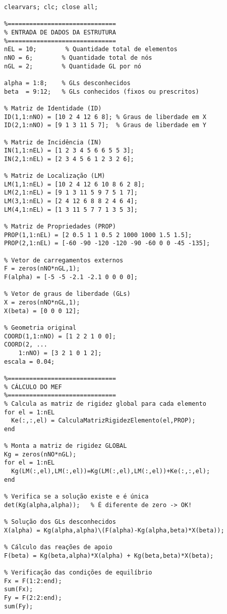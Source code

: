 \documentclass[deposito, acronym, symbols]{fei}
\begin{document}
\begin{lstlisting}
clearvars; clc; close all;

%==============================
% ENTRADA DE DADOS DA ESTRUTURA
%==============================
nEL = 10;        % Quantidade total de elementos
nNO = 6;        % Quantidade total de nós
nGL = 2;        % Quantidade GL por nó

alpha = 1:8;    % GLs desconhecidos
beta  = 9:12;   % GLs conhecidos (fixos ou prescritos)

% Matriz de Identidade (ID)
ID(1,1:nNO) = [10 2 4 12 6 8]; % Graus de liberdade em X
ID(2,1:nNO) = [9 1 3 11 5 7];  % Graus de liberdade em Y

% Matriz de Incidência (IN)
IN(1,1:nEL) = [1 2 3 4 5 6 6 5 5 3];
IN(2,1:nEL) = [2 3 4 5 6 1 2 3 2 6];

% Matriz de Localização (LM)
LM(1,1:nEL) = [10 2 4 12 6 10 8 6 2 8];
LM(2,1:nEL) = [9 1 3 11 5 9 7 5 1 7];
LM(3,1:nEL) = [2 4 12 6 8 8 2 4 6 4];
LM(4,1:nEL) = [1 3 11 5 7 7 1 3 5 3];

% Matriz de Propriedades (PROP)
PROP(1,1:nEL) = [2 0.5 1 1 0.5 2 1000 1000 1.5 1.5];
PROP(2,1:nEL) = [-60 -90 -120 -120 -90 -60 0 0 -45 -135];

% Vetor de carregamentos externos
F = zeros(nNO*nGL,1);
F(alpha) = [-5 -5 -2.1 -2.1 0 0 0 0];

% Vetor de graus de liberdade (GLs)
X = zeros(nNO*nGL,1);
X(beta) = [0 0 0 12];

% Geometria original
COORD(1,1:nNO) = [1 2 2 1 0 0];
COORD(2, ...
    1:nNO) = [3 2 1 0 1 2];
escala = 0.04;

%==============================
% CÁLCULO DO MEF
%==============================
% Calcula as matriz de rigidez global para cada elemento
for el = 1:nEL
  Ke(:,:,el) = CalculaMatrizRigidezElemento(el,PROP);
end

% Monta a matriz de rigidez GLOBAL
Kg = zeros(nNO*nGL);
for el = 1:nEL
  Kg(LM(:,el),LM(:,el))=Kg(LM(:,el),LM(:,el))+Ke(:,:,el);
end

% Verifica se a solução existe e é única
det(Kg(alpha,alpha));   % É diferente de zero -> OK!  

% Solução dos GLs desconhecidos
X(alpha) = Kg(alpha,alpha)\(F(alpha)-Kg(alpha,beta)*X(beta));

% Cálculo das reações de apoio
F(beta) = Kg(beta,alpha)*X(alpha) + Kg(beta,beta)*X(beta);

% Verificação das condições de equilíbrio
Fx = F(1:2:end);
sum(Fx);  
Fy = F(2:2:end);
sum(Fy);


\end{lstlisting}
\end{document}
